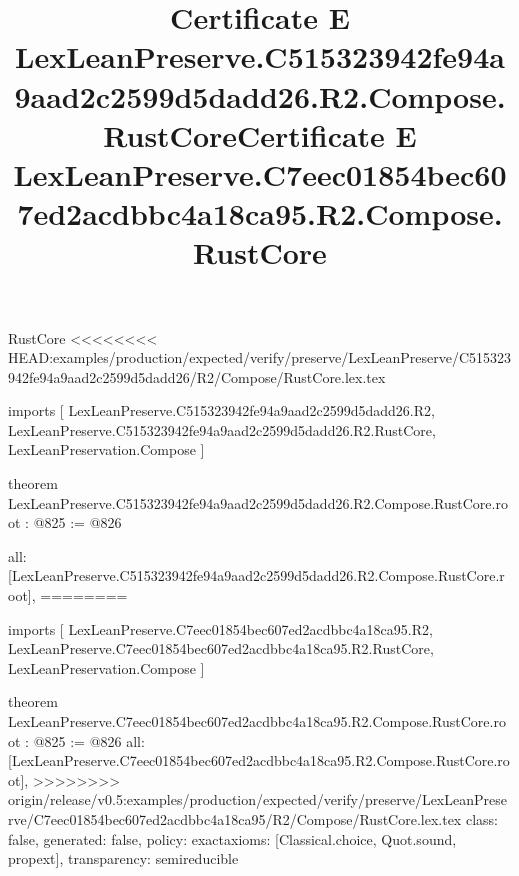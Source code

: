 \begin{lexlean}{RustCore}
<<<<<<<< HEAD:examples/production/expected/verify/preserve/LexLeanPreserve/C515323942fe94a9aad2c2599d5dadd26/R2/Compose/RustCore.lex.tex
\title{Certificate E LexLeanPreserve.C515323942fe94a9aad2c2599d5dadd26.R2.Compose.RustCore}
\begin{coremodule}
imports [
  LexLeanPreserve.C515323942fe94a9aad2c2599d5dadd26.R2,
  LexLeanPreserve.C515323942fe94a9aad2c2599d5dadd26.R2.RustCore,
  LexLeanPreservation.Compose
]

theorem LexLeanPreserve.C515323942fe94a9aad2c2599d5dadd26.R2.Compose.RustCore.root : @825 := @826 {
  all: [LexLeanPreserve.C515323942fe94a9aad2c2599d5dadd26.R2.Compose.RustCore.root],
========
\title{Certificate E LexLeanPreserve.C7eec01854bec607ed2acdbbc4a18ca95.R2.Compose.RustCore}
\begin{coremodule}
imports [
  LexLeanPreserve.C7eec01854bec607ed2acdbbc4a18ca95.R2,
  LexLeanPreserve.C7eec01854bec607ed2acdbbc4a18ca95.R2.RustCore,
  LexLeanPreservation.Compose
]

theorem LexLeanPreserve.C7eec01854bec607ed2acdbbc4a18ca95.R2.Compose.RustCore.root : @825 := @826 {
  all: [LexLeanPreserve.C7eec01854bec607ed2acdbbc4a18ca95.R2.Compose.RustCore.root],
>>>>>>>> origin/release/v0.5:examples/production/expected/verify/preserve/LexLeanPreserve/C7eec01854bec607ed2acdbbc4a18ca95/R2/Compose/RustCore.lex.tex
  class: false,
  generated: false,
  policy: exact{axioms: [Classical.choice, Quot.sound, propext]},
  transparency: semireducible
}


\end{coremodule}}
\end{coremodule}
\end{lexlean}
